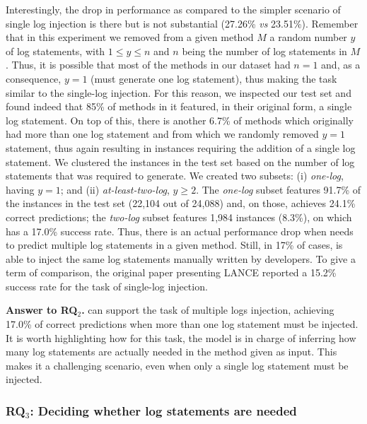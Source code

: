Interestingly, the drop in performance as compared to the simpler scenario of single log injection is there but is not substantial (27.26\% \emph{vs} 23.51\%). Remember that in this experiment we removed from a given \java method $M$ a random number $y$ of log statements, with $1 \leq y \leq n$ and $n$ being the number of log statements in $M$. Thus, it is possible that most of the methods in our dataset had $n=1$ and, as a consequence, $y=1$ (\ie \approach must generate one log statement), thus making the task similar to the single-log injection. For this reason, we inspected our test set and found indeed that 85\% of methods in it featured, in their original form, a single log statement. On top of this, there is another 6.7\% of methods which originally had more than one log statement and from which we randomly removed $y=1$ statement, thus again resulting in instances requiring the addition of a single log statement. We clustered the instances in the test set based on the number of log statements that \approach was required to generate. We created two subsets: (i) \emph{one-log}, having $y=1$; and (ii) \emph{at-least-two-log}, $y\geq2$. The \emph{one-log} subset features 91.7\% of the instances in the test set (22,104 out of 24,088) and, on those, \approach achieves 24.1\% correct predictions; the \emph{two-log} subset features 1,984 instances (8.3\%), on which \approach has a 17.0\% success rate. Thus, there is an actual performance drop when \approach needs to predict multiple log statements in a given method. Still, in 17\% of cases, \approach is able to inject the same log statements manually written by developers. To give a term of comparison, the original paper presenting LANCE \cite{mastropaolo2022using} reported a 15.2\% success rate for the task of single-log injection.

\vspace{0.2cm}
\begin{resultbox}
\textbf{Answer to RQ$_2$.} \approach can support the task of multiple logs injection, achieving 17.0\% of correct predictions when more than one log statement must be injected. It is worth highlighting how for this task, the model is in charge of inferring how many log statements are actually needed in the method given as input. This makes it a challenging scenario, even when only a single log statement must be injected.
\end{resultbox}

\subsubsection{RQ$_{3}$: Deciding whether log statements are needed}
\label{sec:rq3}

